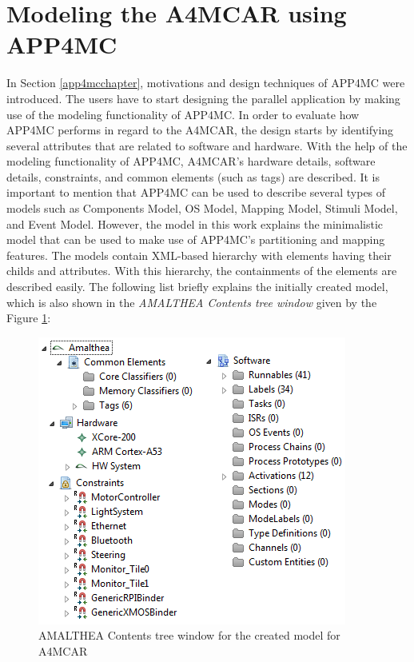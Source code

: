 \section{Modeling the A4MCAR using APP4MC}
In Section \ref{app4mcchapter}, motivations and design techniques of APP4MC were introduced. The users have to start designing the parallel application by making use of the modeling functionality of APP4MC. In order to evaluate how APP4MC performs in regard to the A4MCAR, the design starts by identifying several attributes that are related to software and hardware. With the help of the modeling functionality of APP4MC, A4MCAR's hardware details, software details, constraints, and common elements (such as tags) are described. It is important to mention that APP4MC can be used to describe several types of models such as Components Model, OS Model, Mapping Model, Stimuli Model, and Event Model. However, the model in this work explains the minimalistic model that can be used to make use of APP4MC's partitioning and mapping features. The models contain XML-based hierarchy with elements having their childs and attributes. With this hierarchy, the containments of the elements are described easily. The following list briefly explains the initially created model, which is also shown in the \textit{AMALTHEA Contents tree window} given by the Figure \ref{fig:overallmodel}:
\begin{figure}[!ht]
	\centering
	\captionsetup{justification=centering}
	\includegraphics[scale=0.8]{content/images/overallmodel.png}
	\caption{AMALTHEA Contents tree window for the created model for A4MCAR}
	\label{fig:overallmodel}
\end{figure}
